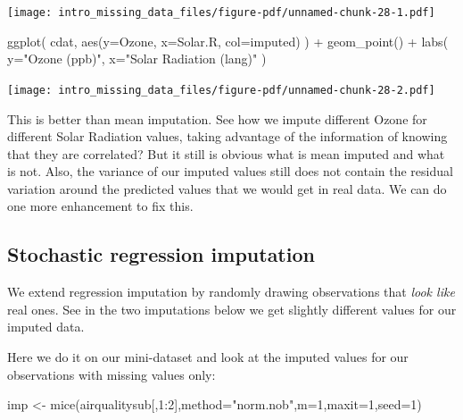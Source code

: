 \documentclass[
  letterpaper,
  DIV=11,
  numbers=noendperiod]{scrreprt}
\newenvironment{Shaded}{}{}
\newcommand{\AttributeTok}[1]{\textcolor[rgb]{0.49,0.56,0.16}{#1}}
\newcommand{\DecValTok}[1]{\textcolor[rgb]{0.25,0.63,0.44}{#1}}
\newcommand{\FunctionTok}[1]{\textcolor[rgb]{0.02,0.16,0.49}{#1}}
\newcommand{\NormalTok}[1]{#1}
\newcommand{\OtherTok}[1]{\textcolor[rgb]{0.00,0.44,0.13}{#1}}
\newcommand{\SpecialCharTok}[1]{\textcolor[rgb]{0.25,0.44,0.63}{#1}}
\newcommand{\StringTok}[1]{\textcolor[rgb]{0.25,0.44,0.63}{#1}}
\begin{document}
\begin{center}
\texttt{[image: intro\_missing\_data\_files/figure-pdf/unnamed-chunk-28-1.pdf]}
\end{center}

\begin{Shaded}
\begin{Highlighting}[]
\FunctionTok{ggplot}\NormalTok{( cdat, }\FunctionTok{aes}\NormalTok{(}\AttributeTok{y=}\NormalTok{Ozone, }\AttributeTok{x=}\NormalTok{Solar.R, }\AttributeTok{col=}\NormalTok{imputed) ) }\SpecialCharTok{+}
    \FunctionTok{geom\_point}\NormalTok{() }\SpecialCharTok{+}
    \FunctionTok{labs}\NormalTok{( }\AttributeTok{y=}\StringTok{"Ozone (ppb)"}\NormalTok{, }\AttributeTok{x=}\StringTok{"Solar Radiation (lang)"}\NormalTok{ )}
\end{Highlighting}
\end{Shaded}

\begin{center}
\texttt{[image: intro\_missing\_data\_files/figure-pdf/unnamed-chunk-28-2.pdf]}
\end{center}

This is better than mean imputation. See how we impute different Ozone
for different Solar Radiation values, taking advantage of the
information of knowing that they are correlated? But it still is obvious
what is mean imputed and what is not. Also, the variance of our imputed
values still does not contain the residual variation around the
predicted values that we would get in real data. We can do one more
enhancement to fix this.

\subsection{Stochastic regression
imputation}\label{stochastic-regression-imputation}

We extend regression imputation by randomly drawing observations that
\emph{look like} real ones. See in the two imputations below we get
slightly different values for our imputed data.

Here we do it on our mini-dataset and look at the imputed values for our
observations with missing values only:

\begin{Shaded}
\begin{Highlighting}[]
\NormalTok{  imp }\OtherTok{\textless{}{-}} \FunctionTok{mice}\NormalTok{(airqualitysub[,}\DecValTok{1}\SpecialCharTok{:}\DecValTok{2}\NormalTok{],}\AttributeTok{method=}\StringTok{"norm.nob"}\NormalTok{,}\AttributeTok{m=}\DecValTok{1}\NormalTok{,}\AttributeTok{maxit=}\DecValTok{1}\NormalTok{,}\AttributeTok{seed=}\DecValTok{1}\NormalTok{)}
\end{Highlighting}
\end{Shaded}
\end{document}
